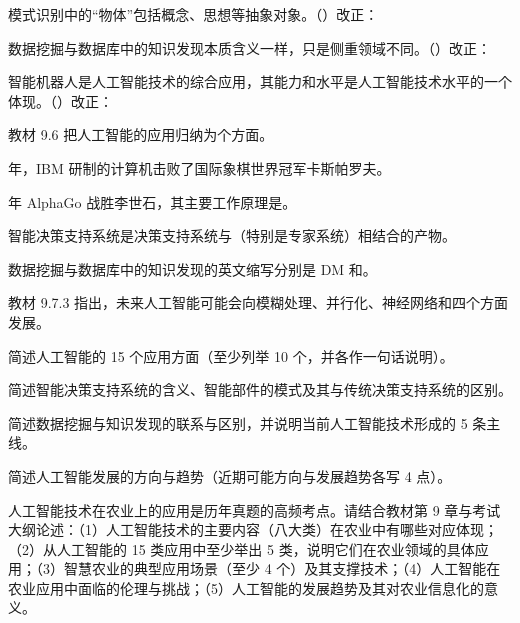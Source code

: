\documentclass[a4paper,11pt]{article}
\begin{document}
\q 模式识别中的“物体”包括概念、思想等抽象对象。\quad（\quad）\quad 改正：\fixblank

\q 数据挖掘与数据库中的知识发现本质含义一样，只是侧重领域不同。\quad（\quad）\quad 改正：\fixblank

\q 智能机器人是人工智能技术的综合应用，其能力和水平是人工智能技术水平的一个体现。\quad（\quad）\quad 改正：\fixblank

\q 教材 9.6 把人工智能的应用归纳为\fillblanks[1.2cm]个方面。

 年，IBM 研制的计算机\fillblanks[2.0cm]击败了国际象棋世界冠军卡斯帕罗夫。

 年 AlphaGo 战胜李世石，其主要工作原理是\fillblanks[2.2cm]。

\q 智能决策支持系统是决策支持系统与\fillblanks[2.2cm]（特别是专家系统）相结合的产物。

\q 数据挖掘与数据库中的知识发现的英文缩写分别是 DM 和\fillblanks[1.4cm]。

\q 教材 9.7.3 指出，未来人工智能可能会向模糊处理、并行化、神经网络和\fillblanks[2.2cm]四个方面发展。

\q 简述人工智能的 15 个应用方面（至少列举 10 个，并各作一句话说明）。\anslines{2.4cm}

\q 简述智能决策支持系统的含义、智能部件的模式及其与传统决策支持系统的区别。\anslines{2.4cm}

\q 简述数据挖掘与知识发现的联系与区别，并说明当前人工智能技术形成的 5 条主线。\anslines{2.4cm}

\q 简述人工智能发展的方向与趋势（近期可能方向与发展趋势各写 4 点）。\anslines{2.4cm}

\newpage
{}
\q 人工智能技术在农业上的应用是历年真题的高频考点。请结合教材第 9 章与考试大纲论述：（1）人工智能技术的主要内容（八大类）在农业中有哪些对应体现；（2）从人工智能的 15 类应用中至少举出 5 类，说明它们在农业领域的具体应用；（3）智慧农业的典型应用场景（至少 4 个）及其支撑技术；（4）人工智能在农业应用中面临的伦理与挑战；（5）人工智能的发展趋势及其对农业信息化的意义。\anslines{5cm}
\end{document}
